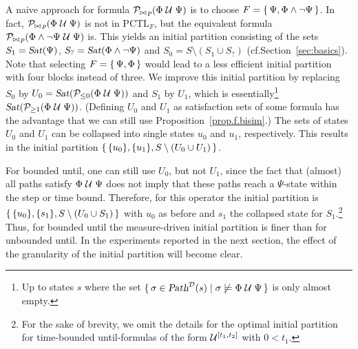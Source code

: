 \documentclass{llncs}
\begin{document}
        A naive approach for formula $\mathcal{P}_{\bowtie \, p}(\Phi \mathrel{\mathcal{U}} \Psi)$
        is to choose $F = \{ \,  \Psi, \Phi \wedge \neg \Psi  \, \}$.
        In fact, $\mathcal{P}_{\bowtie \, p}(\Phi \mathrel{\mathcal{U}} \Psi)$ is not in PCTL$_F$, but the equivalent
        formula $\mathcal{P}_{\bowtie \, p}(\Phi \wedge \neg \Psi \mathrel{\mathcal{U}} \Psi)$ is.
        This yields an initial partition consisting of the sets $S_1 = \mbox{\sl Sat}(\Psi)$, $S_? = \mbox{\sl Sat}(\Phi
        \wedge \neg \Psi)$ and $S_0 = S \setminus (S_1 \cup S_?)$
	(cf.\@ Section~\ref{sec:basics}).
	Note that selecting $F = \{ \,  \Psi, \Phi  \, \}$
	would lead to a less efficient initial partition
	with four blocks instead of three.
        We improve this initial partition by replacing $S_0$
        by $U_0 = \mbox{\sl Sat}(\mathcal{P}_{\leq 0}(\Phi \mathrel{\mathcal{U}} \Psi))$
        and $S_1$ by $U_1$,
        which is essentially\footnote{
                Up to states $s$ where the set
                $\{ \,  \sigma \in \mbox{\sl Path}^{\mathcal{D}}(s) \mid \sigma \not\models \Phi \mathrel{\mathcal{U}} \Psi  \, \}$
                is only almost empty.
%
                }
        $\mbox{\sl Sat}(\mathcal{P}_{\geq 1}(\Phi \mathrel{\mathcal{U}} \Psi))$.
	(Defining $U_0$ and $U_1$ as satisfaction sets of some formula has the advantage
	that we can still use Proposition~\ref{prop.f.bisim}.)
        The sets of states $U_0$ and $U_1$
        can be collapsed into single states $u_0$ and $u_1$, respectively.
        This results in the initial partition $\{ \,  \{u_0\}, \{u_1\}, S \setminus (U_0 \cup U_1) \, \}$.

        For bounded until, one can still use $U_0$, but not $U_1$,
        since the fact that (almost) all paths satisfy $\Phi \mathrel{\mathcal{U}} \Psi$
        does not imply that these paths reach a $\Psi$-state within the step or time bound.
        Therefore, for this operator the initial partition is $\{ \,  \{u_0\}, \{s_1\}, S \setminus (U_0 \cup S_1) \, \}$
        with $u_0$ as before and $s_1$ the collapsed state for $S_1$.\footnote{
                For the sake of brevity,
                we omit the details for the optimal initial partition for time-bounded until-formulas
                of the form $\mathrel{\mathcal{U}^{[t_1,t_2]}}$ with $0 < t_1$.
                }
        Thus, for bounded until the measure-driven initial partition is finer than for unbounded until.
        In the experiments reported in the next section, the effect of the granularity of the initial
        partition will become clear.
\end{document}
